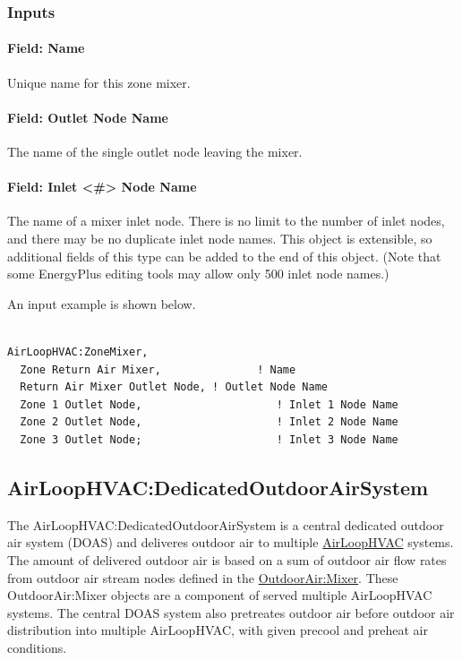 \subsubsection{Inputs}

\paragraph{Field: Name}

Unique name for this zone mixer.

\paragraph{Field: Outlet Node Name}

The name of the single outlet node leaving the mixer.

\paragraph{Field: Inlet \textless{}\#\textgreater{} Node Name}

The name of a mixer inlet node. There is no limit to the number of inlet nodes, and there may be no duplicate inlet node names.  This object is extensible, so additional fields of this type can be added to the end of this object.  (Note that some EnergyPlus editing tools may allow only 500 inlet node names.)

An input example is shown below.

\begin{lstlisting}

AirLoopHVAC:ZoneMixer,
  Zone Return Air Mixer,               ! Name
  Return Air Mixer Outlet Node, ! Outlet Node Name
  Zone 1 Outlet Node,                     ! Inlet 1 Node Name
  Zone 2 Outlet Node,                     ! Inlet 2 Node Name
  Zone 3 Outlet Node;                     ! Inlet 3 Node Name
\end{lstlisting}

\subsection{AirLoopHVAC:DedicatedOutdoorAirSystem}\label{airloophvacdedicatedoutdoorairsystem}

The AirLoopHVAC:DedicatedOutdoorAirSystem is a central dedicated outdoor air system (DOAS) and deliveres outdoor air to multiple \hyperref[airloophvac]{AirLoopHVAC} systems. The amount of delivered outdoor air is based on a sum of outdoor air flow rates from outdoor air stream nodes defined in the \hyperref[outdoorairmixer]{OutdoorAir:Mixer}. These OutdoorAir:Mixer objects are a component of served multiple AirLoopHVAC systems. The central DOAS system also pretreates outdoor air before outdoor air distribution into multiple AirLoopHVAC, with given precool and preheat air conditions.

